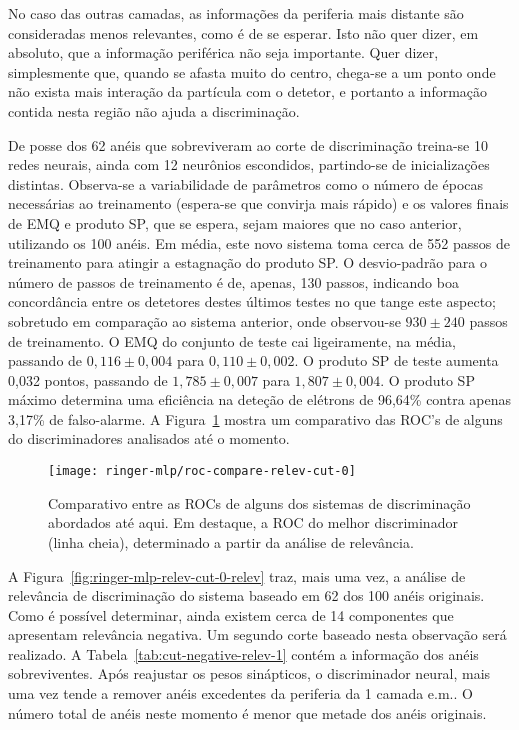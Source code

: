 No caso das outras camadas, as informações da periferia mais distante são
consideradas menos relevantes, como é de se esperar. Isto não quer dizer, em
absoluto, que a informação periférica não seja importante. Quer dizer,
simplesmente que, quando se afasta muito do centro, chega-se a um ponto onde
não exista mais interação da partícula com o detetor, e portanto a informação
contida nesta região não ajuda a discrimina\c{c}ão.

De posse dos 62 anéis que sobreviveram ao corte de discriminação treina-se 10
redes neurais, ainda com 12 neurônios escondidos, partindo-se de inicializações
distintas. Observa-se a variabilidade de parâmetros como o número de épocas
necessárias ao treinamento (espera-se que convirja mais rápido) e os valores
finais de EMQ e produto SP, que se espera, sejam maiores que no caso anterior,
utilizando os 100 anéis. Em média, este novo sistema toma cerca de 552 passos
de treinamento para atingir a estagnação do produto SP. O desvio-padrão para o
número de passos de treinamento é de, apenas, 130 passos, indicando boa
concordância entre os detetores destes últimos testes no que tange este
aspecto; sobretudo em comparação ao sistema anterior, onde observou-se
$930\pm240$ passos de treinamento. O EMQ do conjunto de teste cai
ligeiramente, na média, passando de $0,116\pm0,004$ para $0,110\pm0,002$. O
produto SP de teste aumenta 0,032 pontos, passando de $1,785\pm0,007$ para
$1,807\pm0,004$. O produto SP máximo determina uma eficiência na deteção de
elétrons de 96,64\% contra apenas 3,17\% de falso-alarme. A
Figura~\ref{fig:ringer-mlp-relev-cut-0-roc} mostra um comparativo das ROC's de
alguns do discriminadores analisados até o momento.

\begin{figure}
\begin{center}
\texttt{[image: ringer-mlp/roc-compare-relev-cut-0]}
\end{center}
\caption{Comparativo entre as ROCs de alguns dos sistemas de discriminação
abordados até aqui. Em destaque, a ROC do melhor discriminador (linha cheia),
determinado a partir da análise de relevância.}
\label{fig:ringer-mlp-relev-cut-0-roc}
\end{figure}

A Figura~\ref{fig:ringer-mlp-relev-cut-0-relev} traz, mais uma vez, a análise
de relevância de discriminação do sistema baseado em 62 dos 100 anéis
originais. Como é possível determinar, ainda existem cerca de 14 componentes
que apresentam relevância negativa. Um segundo corte baseado nesta observação
será realizado. A Tabela~\ref{tab:cut-negative-relev-1} contém a informação
dos anéis sobreviventes. Após reajustar os pesos sinápticos, o discriminador
neural, mais uma vez tende a remover anéis excedentes da periferia da 1\eira
camada e.m.. O número total de anéis neste momento é menor que metade dos
anéis originais.

